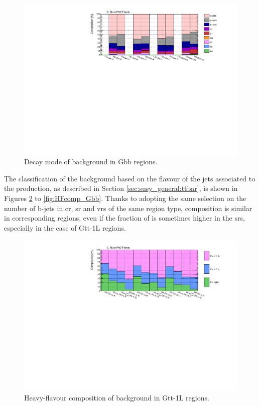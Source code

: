 \begin{figure}[h]
\includegraphics[width=\textwidth]{figures/strong_prod/comp_plots/Gbb_tt.pdf}
\caption{Decay mode of \ttbar background in Gbb regions.}
	\label{fig:ttcomp_Gbb}
\end{figure}


The classification of the \ttbar background based on the flavour of the jets associated to the 
\ttbar production, as described in Section \ref{sec:susy_general:ttbar}, is shown in Figures 
\ref{fig:HFcomp_Gtt1L} to \ref{fig:HFcomp_Gbb}.
Thanks to adopting the same selection on the number of b-jets in \gls{cr}, \gls{sr} and \glspl{vr} 
of the same region type, composition is similar in corresponding regions, even if the fraction of 
\tthf is sometimes higher in the \glspl{sr}, especially in the case of Gtt-1L regions. 


\begin{figure}[h]
\includegraphics[width=\textwidth]{figures/strong_prod/comp_plots/Gtt_1L_HF.pdf}
\caption{Heavy-flavour composition of \ttbar background in Gtt-1L regions.}
	\label{fig:HFcomp_Gtt1L}
\end{figure}

